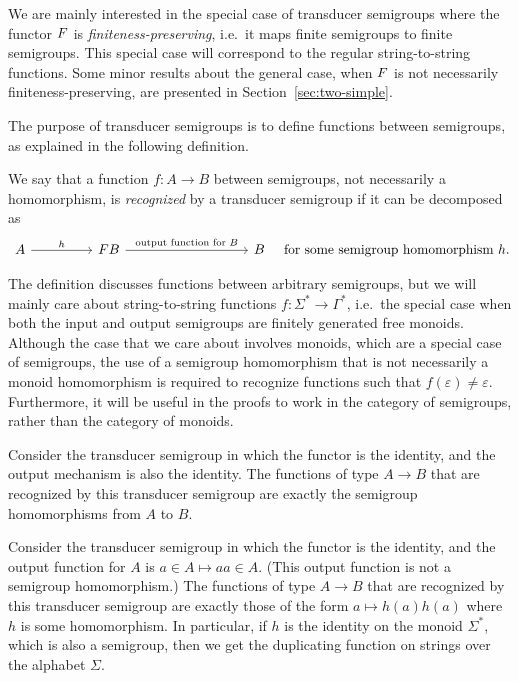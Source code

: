 We are mainly interested in the special case of transducer semigroups where the functor $\functor$ is \emph{finiteness-preserving}, i.e.~it maps finite semigroups to finite semigroups. This special case will correspond to the regular string-to-string functions. Some minor results about the general case, when $\functor$ is not necessarily finiteness-preserving, are presented in Section~\ref{sec:two-simple}.

The purpose of transducer semigroups is to define functions between semigroups, as explained in the following definition. 
\begin{definition}
 We say that a function $f\colon A \to B$ between semigroups, not necessarily a homomorphism, is \emph{recognized} by a transducer semigroup if it can be decomposed as
 \[
 \begin{tikzcd}
 [column sep=1.6cm]
 A 
 \ar[r,"h"]
 &
 \functor B
 \ar[rr,"\text{output function for $B$}"]
 &&
 B
 \end{tikzcd}
 \quad
 \text{for some semigroup homomorphism}\ h.
 \]
\end{definition}
The definition discusses functions between arbitrary semigroups, but we will
mainly care about string-to-string functions $f\colon \Sigma^* \to \Gamma^*$,
i.e.~the special case when both the input and output semigroups are finitely
generated free monoids. Although the case that we care about involves monoids,
which are a special case of semigroups, the use of a semigroup homomorphism that
is not necessarily a monoid homomorphism is required to recognize functions such
that $f(\varepsilon)\neq\varepsilon$. Furthermore, it will be useful in the
proofs to work in the category of semigroups, rather than the category of monoids.

\begin{example}
 Consider the transducer semigroup in which the functor is the identity, and the output mechanism is also the identity. The functions of type $A \to B$ that are recognized by this transducer semigroup are exactly the semigroup homomorphisms from $A$ to $B$.
\end{example}

\begin{example}\label{ex:duplicator}
 Consider the transducer semigroup in which the functor is the identity, and the output function for $A$ is $a \in A \mapsto aa \in A$. (This output function is not a semigroup homomorphism.)
 The functions of type $A \to B$ that are recognized by this transducer semigroup are exactly those of the form $a \mapsto h(a)h(a)$ where $h$ is some homomorphism. In particular, if $h$ is the identity on the monoid $\Sigma^*$, which is also a semigroup, then we get the duplicating function on strings over the alphabet $\Sigma$.
\end{example}




